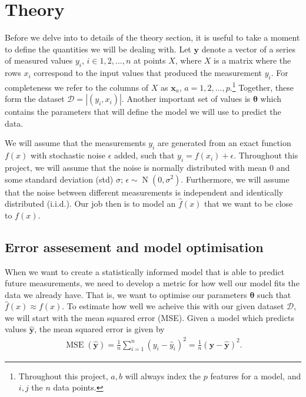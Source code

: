 \documentclass[twocolumn,english,notitlepage]{article}
\renewcommand{\vec}[1]{\boldsymbol{#1}}
\newcommand{\vclosed}[1]{\left|#1\right|}
\DeclareMathOperator{\mse}{\operatorname{MSE}}
\begin{document}
\section{Theory}
    Before we delve into to details of the theory section, it is useful to take a moment to define the quantities we will be dealing with. Let $\vec{y}$ denote a vector of a series of measured values $y_i$, $i\in 1, 2,..., n$ at points $X$, where $X$ is a matrix where the rows $x_i$ correspond to the input values that produced the measurement $y_i$. For completeness we refer to the columns of $X$ as $\vec{x}_a$, $a=1, 2,..., p$.\footnote{Throughout this project, $a, b$ will always index the $p$ features for a model, and $i, j$ the $n$ data points.} Together, these form the dataset $\mathcal{D} = \vclosed{(y_i, x_i)}$. Another important set of values is $\vec{\theta}$ which contains the parameters that will define the model we will use to predict the data.

    We will assume that the measurements $y_i$ are generated from an exact function $f(x)$ with stochastic noise $\epsilon$ added, such that $y_i = f(x_i) + \epsilon$. Throughout this project, we will assume that the noise is normally distributed with mean 0 and some standard deviation (std) $\sigma$; $\epsilon \sim \operatorname{N}(0,\sigma^2)$. Furthermore, we will assume that the noise between different measurements is independent and identically distributed (i.i.d.). Our job then is to model an $\hat{f}(x)$ that we want to be close to $f(x)$.

    \subsection{Error assesement and model optimisation}
        When we want to create a statistically informed model that is able to predict future measurements, we need to develop a metric for how well our model fits the data we already have. That is, we want to optimise our parameters $\vec{\theta}$ such that $\hat{f}(x) \approx f(x)$. To estimate how well we acheive this with our given dataset $\mathcal{D}$, we will start with the mean squared error (MSE). Given a model which predicts values $\vec{\hat{y}}$, the mean squared error is given by
        \begin{align}
            \boxed{
                \mse(\vec{\hat{y}}) = \frac{1}{n} \sum_{i=1}^n (y_i-\hat{y}_i)^2 = \frac{1}{n} (\vec{y} - \vec{\hat{y}})^2.
            }
        \end{align}
\end{document}
